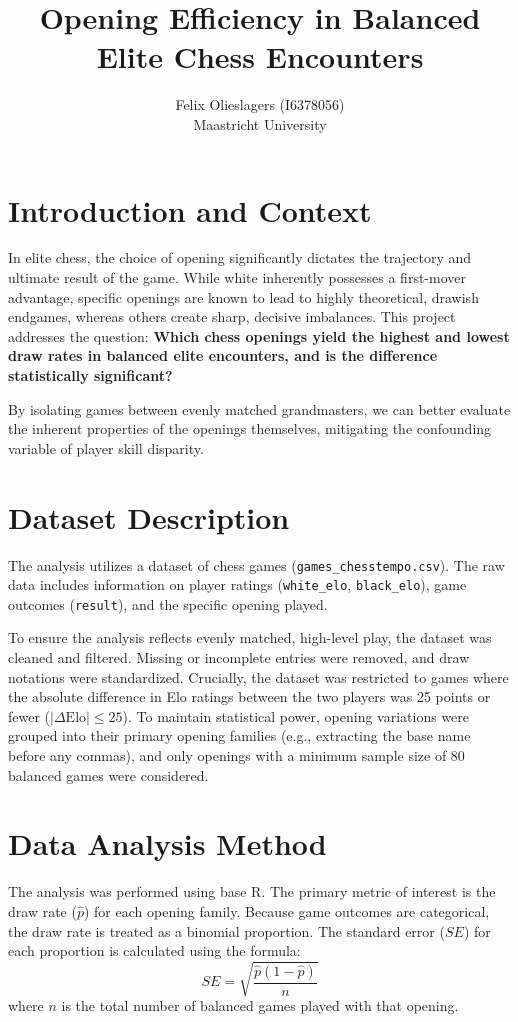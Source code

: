 \documentclass[11pt, a4paper]{article}
\title{Opening Efficiency in Balanced Elite Chess Encounters}
\author{Felix Olieslagers (I6378056) \\ Maastricht University}
\begin{document}
\maketitle

\section{Introduction and Context}
In elite chess, the choice of opening significantly dictates the trajectory and ultimate result of the game. While white inherently possesses a first-mover advantage, specific openings are known to lead to highly theoretical, drawish endgames, whereas others create sharp, decisive imbalances. This project addresses the question: \textbf{Which chess openings yield the highest and lowest draw rates in balanced elite encounters, and is the difference statistically significant?} 

By isolating games between evenly matched grandmasters, we can better evaluate the inherent properties of the openings themselves, mitigating the confounding variable of player skill disparity.

\section{Dataset Description}
The analysis utilizes a dataset of chess games (\texttt{games\_chesstempo.csv}). The raw data includes information on player ratings (\texttt{white\_elo}, \texttt{black\_elo}), game outcomes (\texttt{result}), and the specific opening played. 

To ensure the analysis reflects evenly matched, high-level play, the dataset was cleaned and filtered. Missing or incomplete entries were removed, and draw notations were standardized. Crucially, the dataset was restricted to games where the absolute difference in Elo ratings between the two players was 25 points or fewer ($|\Delta \text{Elo}| \le 25$). To maintain statistical power, opening variations were grouped into their primary opening families (e.g., extracting the base name before any commas), and only openings with a minimum sample size of 80 balanced games were considered.

\section{Data Analysis Method}
The analysis was performed using base R. The primary metric of interest is the draw rate ($\hat{p}$) for each opening family. Because game outcomes are categorical, the draw rate is treated as a binomial proportion. The standard error ($SE$) for each proportion is calculated using the formula:
\begin{equation}
    SE = \sqrt{\frac{\hat{p}(1 - \hat{p})}{n}}
\end{equation}
where $n$ is the total number of balanced games played with that opening. 
\end{document}
